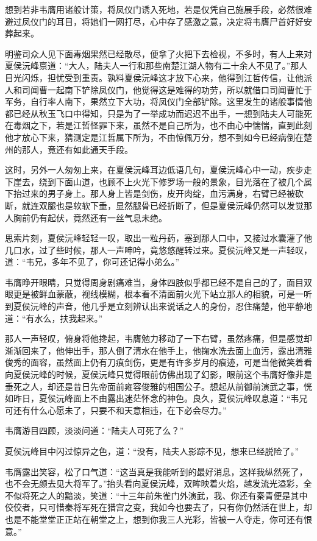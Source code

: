 想到若非韦膺用诸般计策，将凤仪门诱入死地，若是仅凭自己施展手段，必然很难避过凤仪门的耳目，将她们一网打尽，心中存了感激之意，决定将韦膺尸首好好安葬起来。

明鉴司众人见下面毒烟果然已经散尽，便拿了火把下去检视，不多时，有人上来对夏侯沅峰禀道：“大人，陆夫人一行和那些南楚江湖人物有二十余人不见了。”那人目光闪烁，担忧受到重责。孰料夏侯沅峰这才放下心来，他得到江哲传信，让他派人和司闻曹一起南下铲除凤仪门，他觉得这是难得的功劳，所以就借口司闻曹忙于军务，自行率人南下，果然立下大功，将凤仪门全部铲除。这里发生的诸般事情他都已经从秋玉飞口中得知，只是为了一举成功而迟迟不出手，一想到陆夫人可能死在毒烟之下，若是江哲怪罪下来，虽然不是自己所为，也不由心中惴惴，直到此刻他才放心下来，猜测定是江哲属下所为，不由惊佩万分，想不到如今已经病倒在楚州的那人，竟还有如此通天手段。

这时，另外一人匆匆上来，在夏侯沅峰耳边低语几句，夏侯沅峰心中一动，疾步走下崖去，绕到下面山道，也顾不上火光下修罗场一般的景象，目光落在了被几个属下抬过来的男子身上。那人身上皆是剑伤，皮开肉绽，血污满身，右臂已经被砍断，就连双腿也是软软下垂，显然腿骨已经折断了，但是夏侯沅峰仍然可以发觉那人胸前仍有起伏，竟然还有一丝气息未绝。

思索片刻，夏侯沅峰轻轻一叹，取出一粒丹药，塞到那人口中，又接过水囊灌了他几口水，过了些时候，那人一声呻吟，竟悠悠醒转过来。夏侯沅峰又是一声轻叹，道：“韦兄，多年不见了，你可还记得小弟么。”

韦膺睁开眼睛，只觉得周身剧痛难当，身体四肢似乎都已经不是自己的了，面目双眼更是被鲜血蒙蔽，视线模糊，根本看不清面前火光下站立那人的相貌，可是一听到夏侯沅峰的声音，他几乎是立刻辨认出来说话之人的身份，忍住痛楚，他平静地道：“有水么，扶我起来。”

那人一声轻叹，俯身将他搀起，韦膺勉力移动了一下右臂，虽然疼痛，但是感觉却渐渐回来了，他伸出手，那人倒了清水在他手上，他掬水洗去面上血污，露出清雅俊秀的面容，虽然面上仍有刀痕剑伤，更是有许多岁月的痕迹，可是当他微笑着看向夏侯沅峰的时候，夏侯沅峰只觉得眼前仿佛出现了幻影，眼前这个韦膺好像非是垂死之人，却还是昔日先帝面前雍容俊雅的相国公子。想起从前御前演武之事，恍如昨日，夏侯沅峰面上不由露出迷茫怀念的神色。良久，夏侯沅峰叹息道：“韦兄可还有什么心愿未了，只要不和天意相违，在下必会尽力。”

韦膺游目四顾，淡淡问道：“陆夫人可死了么？”

夏侯沅峰目中闪过惊异之色，道：“没有，陆夫人影踪不见，想来已经脱险了。”

韦膺露出笑容，松了口气道：“这当真是我能听到的最好消息，这样我纵然死了，也不会无颜去见大将军了。”抬头看向夏侯沅峰，双眸映着火焰，越发流光溢彩，全不似将死之人的黯淡，笑道：“十三年前朱雀门外演武，我、你还有秦青便是其中佼佼者，只可惜秦将军死在猎宫之变，我如今也要去了，只有你仍然活在世上，却也是不能堂堂正正站在朝堂之上，想到你我三人光彩，皆被一人夺走，你可还有恨意。”

